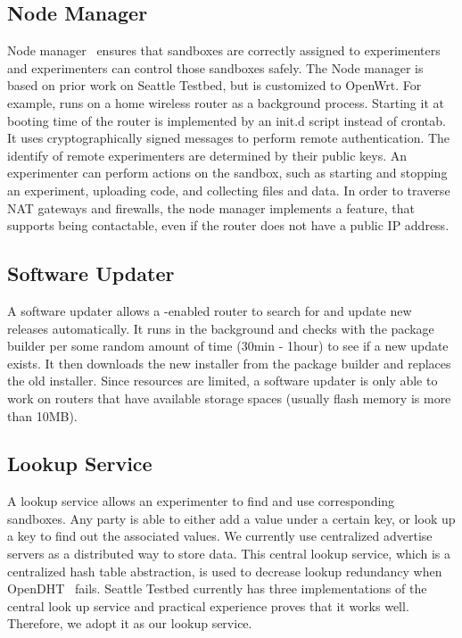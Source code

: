 \subsection{Node Manager}
\label{sec.nodemanager}
Node manager~\cite{nodemanager} ensures that sandboxes are correctly assigned to experimenters and experimenters can control those sandboxes safely. The Node manager is based on prior work on Seattle Testbed, but is customized to OpenWrt. For example, \sysname runs on a home wireless router as a background process. Starting it at booting time of the router is implemented by an init.d script instead of crontab. It uses cryptographically signed messages to perform remote authentication.  The identify of remote experimenters are determined by their public keys. An experimenter can perform actions on the sandbox, such as starting and stopping an experiment, uploading code, and collecting files and data. In order to traverse NAT gateways and firewalls, the node manager implements a feature, that supports being contactable, even if the router does not have a public IP address. 

\subsection{Software Updater}
\label{sec.softwareupdater}
A software updater allows a \sysname-enabled router to search for and update new releases automatically. It runs in the background and checks with the package builder per some random amount of time (30min - 1hour) to see if a new update exists. It then downloads the new installer from the package builder and replaces the old installer. Since resources are limited, a software updater is only able to work on routers that have available storage spaces (usually flash memory is more than 10MB).  

\subsection{Lookup Service}
\label{sec.lookupservice}
A lookup service allows an experimenter to find and use corresponding sandboxes. Any party is able to either add a value under a certain key, or look up a key to find out the associated values. We currently use centralized advertise servers as a distributed way to store data. This central lookup service, which is a centralized hash table abstraction, is used to decrease lookup redundancy when OpenDHT~\cite{rhea2005opendht} fails. Seattle Testbed currently has three implementations of the central look up service and practical experience proves that it works well. Therefore, we adopt it as our lookup service.

